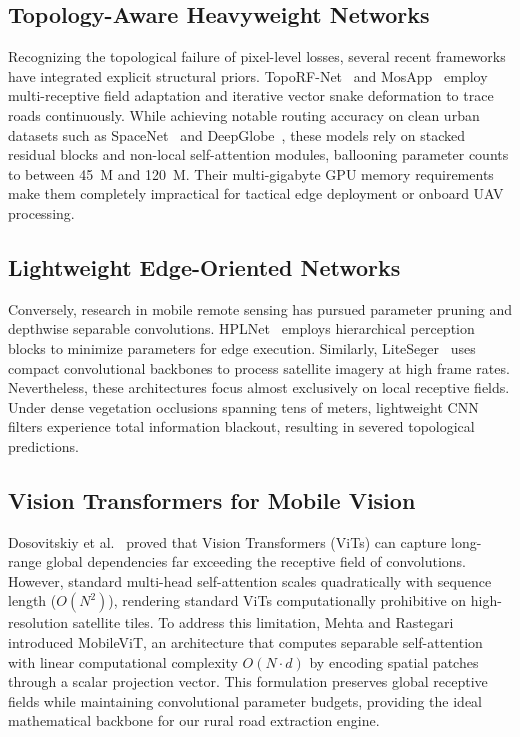 \documentclass[conference]{IEEEtran}
\begin{document}
\subsection{Topology-Aware Heavyweight Networks}
Recognizing the topological failure of pixel-level losses, several recent frameworks have integrated explicit structural priors. TopoRF-Net~\cite{toporf2025} and MosApp~\cite{mosapp2024} employ multi-receptive field adaptation and iterative vector snake deformation to trace roads continuously. While achieving notable routing accuracy on clean urban datasets such as SpaceNet~\cite{vanetten2018spacenet} and DeepGlobe~\cite{demir2018deepglobe}, these models rely on stacked residual blocks and non-local self-attention modules, ballooning parameter counts to between 45~M and 120~M. Their multi-gigabyte GPU memory requirements make them completely impractical for tactical edge deployment or onboard UAV processing.

\subsection{Lightweight Edge-Oriented Networks}
Conversely, research in mobile remote sensing has pursued parameter pruning and depthwise separable convolutions. HPLNet~\cite{hplnet2025} employs hierarchical perception blocks to minimize parameters for edge execution. Similarly, LiteSeger~\cite{liteseger2025} uses compact convolutional backbones to process satellite imagery at high frame rates. Nevertheless, these architectures focus almost exclusively on local receptive fields. Under dense vegetation occlusions spanning tens of meters, lightweight CNN filters experience total information blackout, resulting in severed topological predictions.

\subsection{Vision Transformers for Mobile Vision}
Dosovitskiy et al.~\cite{dosovitskiy2020vit} proved that Vision Transformers (ViTs) can capture long-range global dependencies far exceeding the receptive field of convolutions. However, standard multi-head self-attention scales quadratically with sequence length ($O(N^2)$), rendering standard ViTs computationally prohibitive on high-resolution satellite tiles. To address this limitation, Mehta and Rastegari~\cite{mehta2022mobilevit} introduced MobileViT, an architecture that computes separable self-attention with linear computational complexity $O(N \cdot d)$ by encoding spatial patches through a scalar projection vector. This formulation preserves global receptive fields while maintaining convolutional parameter budgets, providing the ideal mathematical backbone for our rural road extraction engine.
\end{document}
